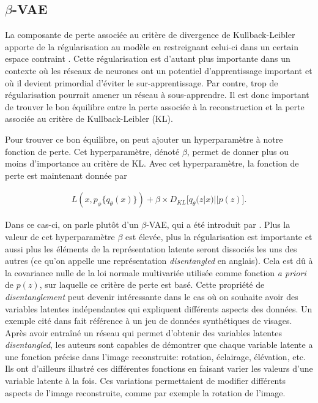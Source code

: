 \subsection{$\beta$-VAE} \label{beta-vae}

La composante de perte associée au critère de divergence de Kullback-Leibler apporte de la régularisation au modèle en restreignant celui-ci dans un certain espace contraint \citep{kingma2013autoencoding}. Cette régularisation est d'autant plus importante dans un contexte où les réseaux de neurones ont un potentiel d'apprentissage important et où il devient primordial d'éviter le sur-apprentissage. Par contre, trop de régularisation pourrait amener un réseau à sous-apprendre. Il est donc important de trouver le bon équilibre entre la perte associée à la reconstruction et la perte associée au critère de Kullback-Leibler (KL).

Pour trouver ce bon équilibre, on peut ajouter un hyperparamètre à notre fonction de perte. Cet hyperparamètre, dénoté $\beta$, permet de donner plus ou moins d'importance au critère de KL. Avec cet hyperparamètre, la fonction de perte est maintenant donnée par

\begin{gather}  \label{eq:loss_betavae}
L(x, p_\phi\{q_\theta(x)\}) +  \beta \times D_{KL}\big[q_\theta(z|x) || p(z)\big].
\end{gather}

Dans ce cas-ci, on parle plutôt d'un $\beta$-VAE, qui a été introduit par \cite{Higgins2017betaVAELB}. Plus la valeur de cet hyperparamètre $\beta$ est élevée, plus la régularisation est importante et aussi plus les éléments de la représentation latente seront dissociés les uns des autres (ce qu'on appelle une représentation \textit{disentangled} en anglais). Cela est dû à la covariance nulle de la loi normale multivariée utilisée comme fonction \textit{a priori} de $p(z)$, sur laquelle ce critère de perte est basé. Cette propriété de \textit{disentanglement} peut devenir intéressante dans le cas où on souhaite avoir des variables latentes indépendantes qui expliquent différents aspects des données. Un exemple cité dans \cite{Higgins2017betaVAELB} fait référence à un jeu de données synthétiques de visages. Après avoir entraîné un réseau qui permet d'obtenir des variables latentes \textit{disentangled}, les auteurs sont capables de démontrer que chaque variable latente a une fonction précise dans l'image reconstruite: rotation, éclairage, élévation, etc. Ils ont d'ailleurs illustré ces différentes fonctions en faisant varier les valeurs d'une variable latente à la fois. Ces variations permettaient de modifier différents aspects de l'image reconstruite, comme par exemple la rotation de l'image.

